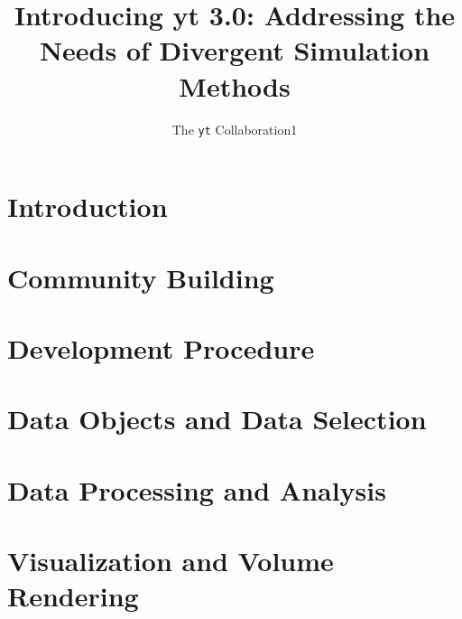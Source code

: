 \documentclass{emulateapj}
\newcommand{\yt}{\texttt{yt}}
\begin{document}
\title{Introducing yt 3.0: Addressing the Needs of Divergent Simulation
Methods}
\author{The \yt{} Collaboration{1}}
\email{}

\begin{abstract}
\end{abstract}

\keywords{}


\maketitle


\section{Introduction}


\section{Community Building}


\section{Development Procedure}


\section{Data Objects and Data Selection}


\section{Data Processing and Analysis}


\section{Visualization and Volume Rendering}

\end{document}
